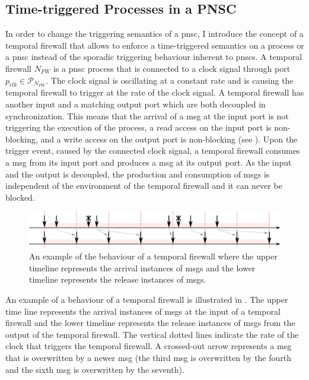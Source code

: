 \subsection{Time-triggered Processes in a PNSC}
\label{sect_tcm_time_tt}
In order to change the triggering semantics of a \gls{pnsc}, I introduce the concept of a temporal firewall that allows to enforce a time-triggered semantics on a process or a \gls{pnsc} instead of the sporadic triggering behaviour inherent to \glspl{pnsc}.
A temporal firewall $N_{\mathit{FW}}$ is a \gls{pnsc} process that is connected to a clock signal through port $p_{clk} \in \mathcal{P}_{N_{\mathit{FW}}}$.
The clock signal is oscillating at a constant rate and is causing the temporal firewall to trigger at the rate of the clock signal.
A temporal firewall has another input and a matching output port which are both decoupled in synchronization.
This means that the arrival of a \gls*{msg} at the input port is not triggering the execution of the process, a read access on the input port is non-blocking, and a write access on the output port is non-blocking (see \Sect{\ref{sect_cci_decoupling_sync}}).
Upon the trigger event, caused by the connected clock signal, a temporal firewall consumes a \gls*{msg} from its input port and produces a \gls*{msg} at its output port.
As the input and the output is decoupled, the production and consumption of \glspl*{msg} is independent of the environment of the temporal firewall and it can never be blocked.
\begin{figure}[bht]\begin{center}
\TopFigSpace
    \centering
    \includegraphics[width=12cm]{fig/rate_control_tt.pdf}
    \CaptionFigSpace
    \caption{An example of the behaviour of a temporal firewall where the upper timeline represents the arrival instances of \glspl*{msg} and the lower timeline represents the release instances of \glspl*{msg}.}
    \label{fig_rate_ctl_tt}
\BotFigSpace
\end{center}\end{figure}
An example of a behaviour of a temporal firewall is illustrated in \Fig{\ref{fig_rate_ctl_tt}}.
The upper time line represents the arrival instances of \glspl*{msg} at the input of a temporal firewall and the lower timeline represents the release instances of \glspl*{msg} from the output of the temporal firewall.
The vertical dotted lines indicate the rate of the clock that triggers the temporal firewall.
A crossed-out arrow represents a \gls*{msg} that is overwritten by a newer \gls*{msg} (\eg the third \gls*{msg} is overwritten by the fourth and the sixth \gls*{msg} is overwritten by the seventh).

